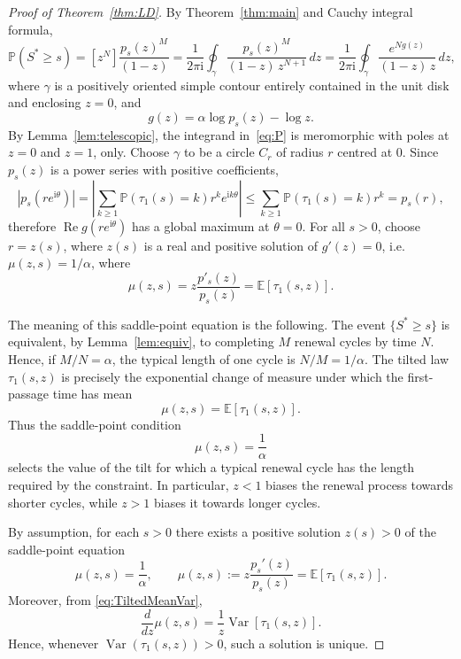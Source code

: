 \documentclass[a4paper,reqno,11pt]{amsart}
\numberwithin{equation}{section}
\def\PR{\mathbb{P}}
\def\EE{{\mathbb E}}
\numberwithin{thm}{section}
\theoremstyle{plain}
\theoremstyle{definition}
\begin{document}
{\begin{proof}[{Proof of Theorem~\ref{thm:LD}}]
{By Theorem~\ref{thm:main}} and Cauchy integral formula,
\begin{equation}\label{eq:P}
\PR(S^*\ge s)
  = [z^N] \frac{p_s(z)^M}{(1-z)}=\frac{1}{2\pi \mathrm{i}}\oint_{\gamma}
  \frac{p_s(z)^M}{(1-z)\,z^{N+1}}\,dz= \frac{1}{2\pi \mathrm{i}}\oint_{\gamma}
  \frac{e^{Ng(z)}}{(1{-}z)\,z}\,dz ,
\end{equation}
where $\gamma$ is a positively oriented simple contour  entirely contained in the unit disk and enclosing $z=0$, and 
\begin{equation}
    g(z)=\alpha\log p_s(z)-\log z.
\end{equation} 
By Lemma~\ref{lem:telescopic}, the integrand in~\eqref{eq:P} is meromorphic with poles at $z=0$ and $z=1$, only. 
Choose $\gamma$ to be a circle $C_r$ of radius $r$ centred at $0$. 
Since  $p_s(z)$ is a power series with positive coefficients, 
\begin{equation}
    |p_s(r e^{\mathrm{i} \theta})|=\left|\sum_{k\geq1} \mathbb{P}(\tau_1(s)=k){r^k e^{\mathrm{i}k\theta}}\right|\leq\sum_{k\geq1} \mathbb{P}(\tau_1(s)=k){r^k} =p_s(r),
\end{equation}
therefore
$\operatorname{Re}g(r{e^{\mathrm{i}\theta}})
$ has a global maximum at $\theta=0$.
For all $s>0$, choose $r=z(s)$, where $z(s)$ is a real and positive solution of $g'(z)=0$, i.e. $ \mu(z,s)=1/\alpha$, where $$\mu(z,s)=z \frac{p'_s(z)}{p_s(z)}=\EE [\tau_1(s,z)] .$$

The meaning of this saddle-point equation is the following.  The event
$\{S^*\geq s\}$ is equivalent, by Lemma~\ref{lem:equiv}, to completing $M$
renewal cycles by time $N$.  Hence, if $M/N=\alpha$, the
typical length of one cycle is $N/M=1/\alpha$.  The tilted law
$\tau_1(s,z)$ is precisely the exponential change of measure under which the
first-passage time has mean
\begin{equation}
    \mu(z,s)=\EE[\tau_1(s,z)] .
\end{equation}
Thus the saddle-point condition
\begin{equation}
    \mu(z,s)=\frac{1}{\alpha}
\end{equation}
selects the value of the tilt for which a typical renewal cycle has the length
required by the constraint.  In particular, $z<1$ biases the renewal process
towards shorter cycles, while $z>1$ biases it towards longer cycles.

By assumption, for each $s>0$ there exists a positive
solution $z(s)>0$ of the saddle-point equation
\begin{equation}
    \mu(z,s)=\frac{1}{\alpha},
    \qquad
    \mu(z,s):=
    z\frac{p_s'(z)}{p_s(z)}
    =
    \EE[\tau_1(s,z)] .
\end{equation}
Moreover, from \eqref{eq:TiltedMeanVar},
\begin{equation}
    \frac{d}{dz}\mu(z,s)
    =
    \frac{1}{z}\operatorname{Var}[\tau_1(s,z)].
\end{equation}
Hence, whenever $\operatorname{Var}(\tau_1(s,z))>0$, such a solution is unique.


\end{proof}}
\end{document}
